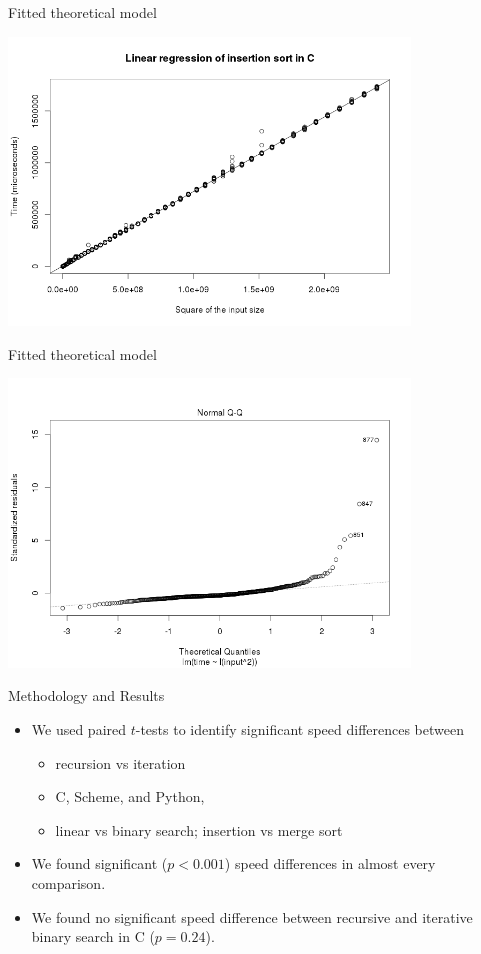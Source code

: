 \documentclass[]{beamer}
\begin{document}
\begin{frame}[t]{Fitted theoretical model}
\begin{center}
	\includegraphics[width=0.8\textwidth]{plots/regression-fit.png}
\end{center}
\end{frame}

\begin{frame}[t]{Fitted theoretical model}
\begin{center}
	\includegraphics[width=0.8\textwidth]{plots/qq-plot.png}
\end{center}
\end{frame}

\begin{frame}[t]{Methodology and Results}
\begin{itemize}
	\item We used paired $t$-tests to identify significant speed differences between
    \begin{itemize}
		\item recursion vs iteration
        \item C, Scheme, and Python,
        \item linear vs binary search; insertion vs merge sort
\end{itemize}
	\item We found significant ($p < 0.001$) speed differences in almost every comparison.
    \item We found no significant speed difference between recursive and iterative binary search in C ($p = 0.24$).
\end{itemize}
\end{frame}
\end{document}
